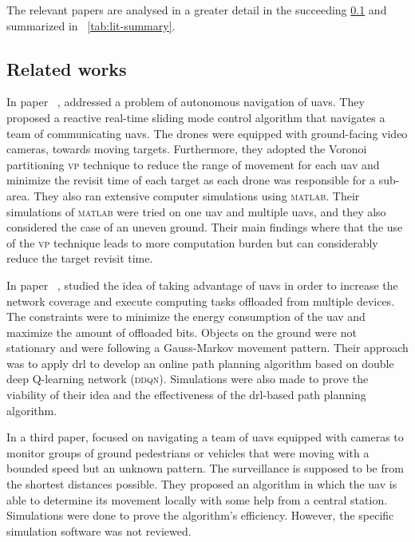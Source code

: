 \documentclass[../main.tex]{subfiles}
\begin{document}
The relevant papers are analysed in a greater detail in
the succeeding \cref{sec:related-work} 
and summarized in ~\ref{tab:lit-summary}.



\subsection{Related works}\label{sec:related-work}

In paper ~\cite{hua20}, \citeauthor{hua20} 
addressed a problem of autonomous navigation of \glspl{uav}. 
They proposed a reactive real-time sliding mode control algorithm 
that navigates a team of communicating \glspl{uav}.
The drones were equipped with ground-facing video cameras,
towards moving targets. 
Furthermore, they adopted the Voronoi partitioning \textsc{vp} technique 
to reduce the range of movement for each \gls{uav} and 
minimize the revisit time of each target as each drone was responsible 
for a sub-area.
They also ran extensive computer simulations using \textsc{matlab}. 
Their simulations of \textsc{matlab} were tried on one \gls{uav} and multiple \glspl{uav},
and they also considered the case of an uneven ground. 
Their main findings where that the use of the \textsc{vp} technique 
leads to more computation burden but can considerably reduce the target 
revisit time.


In paper ~\cite{pen21}, \citeauthor{pen21} studied the idea 
of taking advantage of \glspl{uav} in order to increase the network
coverage and execute computing tasks offloaded from multiple devices. 
The constraints were to minimize the energy consumption of the \gls{uav} 
and maximize the amount of offloaded bits. 
Objects on the ground were not stationary and were following a Gauss-Markov 
movement pattern. Their approach was to apply \gls{drl} to develop an online path planning algorithm based on double deep Q-learning network (\textsc{ddqn}).
Simulations were also made to prove the viability of their idea and the 
effectiveness of the \gls{drl}-based path planning algorithm.

In a third paper, \citeauthor{hua21} focused on navigating a team
of \glspl{uav} equipped with cameras to monitor groups of ground 
pedestrians or vehicles that were moving with a bounded speed but an unknown pattern. 
The surveillance is supposed to be from the shortest distances possible. 
They proposed an algorithm in which the \gls{uav} is able to determine 
its movement locally with some help from a central station.
Simulations were done to prove the algorithm's efficiency. However, the 
specific simulation software was not reviewed. 
\end{document}
